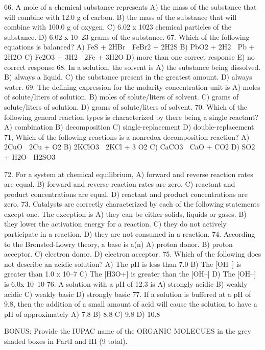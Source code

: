 \documentclass[addpoints, 12pt]{exam}
\begin{document}
\begin{questions}
66.  A mole of a chemical substance represents
A)	the mass of the substance that will combine with 12.0 g of carbon.
B)	the mass of the substance that will combine with 100.0 g of oxygen.
C)	6.02 x 1023 chemical particles of the substance.
D)	6.02 x 10–23 grams of the substance.
67.  Which of the following equations is balanced?
A)	FeS + 2HBr  FeBr2 + 2H2S
B)	PbO2 + 2H2  Pb + 2H2O
C)	Fe2O3 + 3H2  2Fe + 3H2O
D)	more than one correct response
E)	no correct response
68.  In a solution, the solvent is
A)	the substance being dissolved.
B)	always a liquid.
C)	the substance present in the greatest amount.
D)	always water.
69.  The defining expression for the molarity concentration unit is
A)	moles of solute/liters of solution.
B)	moles of solute/liters of solvent.
C)	grams of solute/liters of solution.
D)	grams of solute/liters of solvent.
70.  Which of the following general reaction types is characterized by there being a single reactant?
A)	combination
B)	decomposition
C)	single-replacement
D)	double-replacement
71,  Which of the following reactions is a nonredox decomposition reaction?
A)	2CuO  2Cu + O2
B)	2KClO3  2KCl + 3 O2
C)	CaCO3  CaO + CO2
D)	SO2 + H2O  H2SO3




72.  For a system at chemical equilibrium,
A)	forward and reverse reaction rates are equal.
B)	forward and reverse reaction rates are zero.
C)	reactant and product concentrations are equal.
D)	reactant and product concentrations are zero.
73.  Catalysts are correctly characterized by each of the following statements except one.  The exception is
A)	they can be either solids, liquids or gases.
B)	they lower the activation energy for a reaction.
C)	they do not actively participate in a reaction.
D)	they are not consumed in a reaction.
74.  According to the Bronsted-Lowry theory, a base is a(n)
A)	proton donor.
B)	proton acceptor.
C)	electron donor.
D)	electron acceptor.
75.  Which of the following does not describe an acidic solution?
A)	The pH is less than 7.0
B)	The [OH–] is greater than 1.0 x 10–7
C)	The [H3O+] is greater than the [OH–]
D)	The [OH–] is 6.0x 10–10
76.  A solution with a pH of 12.3 is
A)	strongly acidic
B)	weakly acidic
C)	weakly basic
D)	strongly basic
77.  If a solution is buffered at a pH of 9.8, then the addition of a small amount of acid will cause the solution to have a pH of approximately
A)	7.8
B)	8.8
C)	9.8
D)	10.8


BONUS:
Provide the IUPAC name of the ORGANIC MOLECUES  in the grey shaded boxes in PartI and  III (9 total).


\end{questions}
\end{document}

